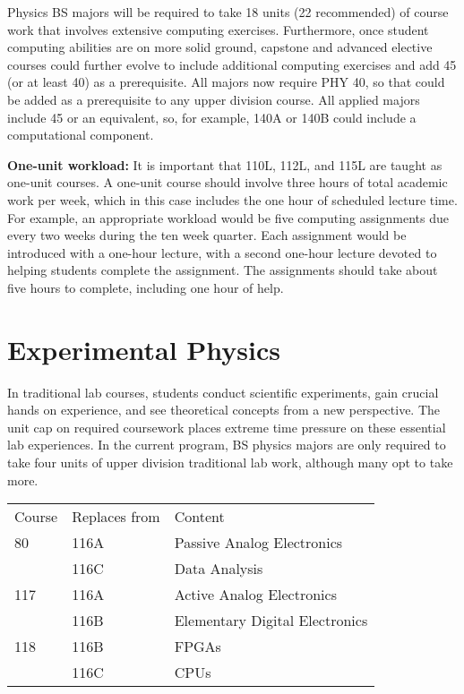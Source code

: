 \documentclass[12pt]{article}
\begin{document}
Physics BS majors will be required to take 18 units (22 recommended)
of course work that involves extensive computing exercises.
Furthermore, once student computing abilities are on more solid
ground, capstone and advanced elective courses could further evolve to
include additional computing exercises and add 45 (or at least 40) as
a prerequisite.  All majors now require PHY 40, so that could be added
as a prerequisite to any upper division course.  All applied majors
include 45 or an equivalent, so, for example, 140A or 140B could include
a computational component.

{\bf One-unit workload: }It is important that 110L, 112L, and 115L are
taught as one-unit courses.  A one-unit course should involve three
hours of total academic work per week, which in this case includes the
one hour of scheduled lecture time.  For example, an appropriate
workload would be five computing assignments due every two weeks
during the ten week quarter.  Each assignment would be introduced with
a one-hour lecture, with a second one-hour lecture devoted to helping
students complete the assignment.  The assignments should take about
five hours to complete, including one hour of help.

\section{Experimental Physics}
\label{sec:labs}

In traditional lab courses, students conduct scientific experiments,
gain crucial hands on experience, and see theoretical concepts from a
new perspective.  The unit cap on required coursework places extreme
time pressure on these essential lab experiences. In the current
program, BS physics majors are only required to take four units of
upper division traditional lab work, although many opt to take more.

\noindent
\vskip 0.25cm
\begin{center}
\begin{tabular}{|lll|}
\hline
Course  & Replaces from & Content \\
80      & 116A        & Passive Analog Electronics \\
        & 116C        & Data Analysis \\
117     & 116A        & Active Analog Electronics \\
        & 116B        & Elementary Digital Electronics \\
118     & 116B        & FPGAs\\
        & 116C        & CPUs\\
\hline
\end{tabular}
\end{center}
\end{document}
